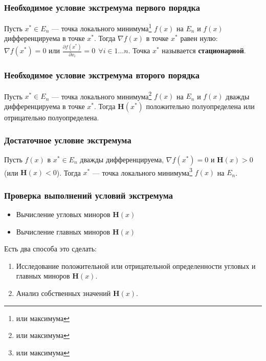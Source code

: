 \subsubsection{Необходимое условие экстремума первого порядка}

Пусть \(x^* \in E_n\) --- точка локального минимума\footnote{или максимума} \(f(x)\) на \(E_n\) и \(f(x)\) дифференцируема в точке \(x^*\). Тогда \(\nabla f(x)\) в точке \(x^*\) равен нулю: \(\nabla f(x^*) = 0\) или \(\frac{\partial f(x^*)}{\partial x_i} = 0 \ \ \forall i \in 1 \dots n \). Точка \(x^*\) называется \textbf{стационарной}.

\subsubsection{Необходимое условие экстремума второго порядка}

Пусть \(x^* \in E_n\) --- точка локального минимума\footnote{или максимума} \(f(x)\) на \(E_n\) и \(f(x)\) дважды дифференцируема в точке \(x^*\). Тогда \(\mathbf H(x^*)\) положительно полуопределена или отрицательно полуопределена.

\subsubsection{Достаточное условие экстремума}

Пусть \(f(x)\) в \(x^* \in E_n\) дважды дифференцируема, \(\nabla f(x^*) = 0\) и \(\mathbf H(x) > 0\) (или \(\mathbf H(x) < 0\)). Тогда \(x^*\) --- точка локального минимума\footnote{или максимума} \(f(x)\) на \(E_n\).

\subsubsection{Проверка выполнений условий экстремума}

\begin{itemize}
    \item Вычисление угловых миноров \(\mathbf H(x)\)
    \item Вычисление главных миноров \(\mathbf H(x)\)
\end{itemize}

Есть два способа это сделать:
\begin{enumerate}
    \item Исследование положительной или отрицательной определенности угловых и главных миноров \(\mathbf H(x)\).
    \item Анализ собственных значений \(\mathbf H(x)\).
\end{enumerate}

